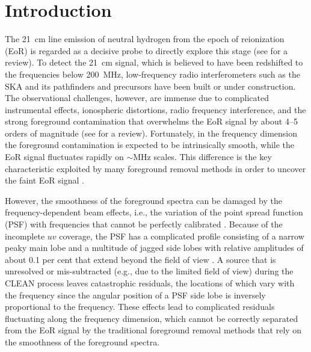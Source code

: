 \documentclass[fleqn,usenatbib]{mnras}
\newcommand{\edittwo}[1]{{\leavevmode\color{magenta}#1}}
\begin{document}
\section{Introduction}
\label{sec:intro}

The \SI{21}{\cm} line emission of neutral hydrogen from the epoch of
reionization (EoR) is regarded as a decisive probe to directly explore
this stage (see \citealt{furlanetto2016rev} for a review).
To detect the \SI{21}{\cm} signal, which is believed to have been
redshifted to the frequencies below \SI{200}{\MHz}, low-frequency
radio interferometers such as the SKA \citep{koopmans2015rev} and its
pathfinders \edittwo{and precursors} have been built or under construction.
The observational challenges, however, are immense due to
complicated instrumental effects, ionospheric distortions, radio frequency
interference, and the strong foreground contamination that
overwhelms the EoR signal by about \numrange{4}{5} orders of magnitude
(see \citealt{morales2010rev} for a review).
Fortunately, in the frequency dimension the foreground contamination
is expected to be intrinsically smooth, while the EoR signal fluctuates
rapidly on $\sim\si{\MHz}$ scales.
This difference is the key characteristic exploited by many foreground
removal methods in order to uncover the faint EoR signal
\citep[e.g.,][]{wang2006,jelic2008,liu2009fgrm,harker2009,chapman2012,chapman2013,wang2013,gu2013,bonaldi2015,mertens2018}.

However, the smoothness of the foreground spectra can be \edittwo{damaged}
by the frequency-dependent beam effects, i.e., the variation of the point
spread function (PSF) with frequencies that cannot be perfectly
calibrated \citep{liu2009ps}.
Because of the incomplete $uv$ coverage,
the PSF has a complicated profile consisting of a narrow peaky main lobe
and a multitude of jagged side lobes with relative amplitudes of about
0.1 per cent that extend beyond the field of view
\citep[e.g.,][their figures 1 and 3]{liu2009ps}.
A source that is unresolved or mis-subtracted (e.g., due to the limited
field of view) during the CLEAN process leaves catastrophic residuals,
the locations of which vary with the frequency since the angular
position of a PSF side lobe is inversely proportional to the frequency.
These effects lead to complicated residuals fluctuating along the
frequency dimension, which cannot be correctly separated from the EoR
signal by the traditional foreground removal methods that rely on
the smoothness of the foreground spectra.
\end{document}
